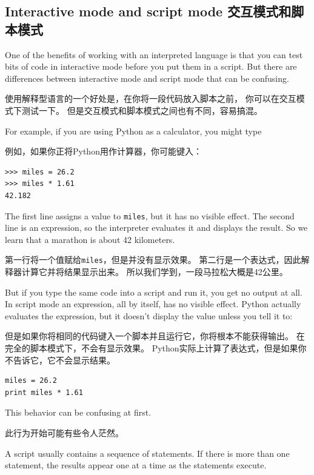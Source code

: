 \documentclass[10pt]{book}
\begin{document}
\begin{CJK}{UTF8}{gbsn}
\section{Interactive mode and script mode 交互模式和脚本模式}

One of the benefits of working with an interpreted language is that
you can test bits of code in interactive mode before you put them
in a script.  But there are differences between interactive mode
and script mode that can be confusing.

使用解释型语言的一个好处是，在你将一段代码放入脚本之前，
你可以在交互模式下测试一下。
但是交互模式和脚本模式之间也有不同，容易搞混。

For example, if you are using Python as a calculator, you might type

例如，如果你正将Python用作计算器，你可能键入：

\begin{verbatim}
>>> miles = 26.2
>>> miles * 1.61
42.182
\end{verbatim}

The first line assigns a value to {\tt miles}, but it has no visible
effect.  The second line is an expression, so the interpreter
evaluates it and displays the result.  So we learn that a marathon is
about 42 kilometers.

第一行将一个值赋给{\tt miles}，但是并没有显示效果。
第二行是一个表达式，因此解释器计算它并将结果显示出来。
所以我们学到，一段马拉松大概是42公里。

But if you type the same code into a script and run it, you get no
output at all.  In script mode an expression, all by itself, has no
visible effect.  Python actually evaluates the expression, but it doesn't
display the value unless you tell it to:

但是如果你将相同的代码键入一个脚本并且运行它，你将根本不能获得输出。
在完全的脚本模式下，不会有显示效果。
Python实际上计算了表达式，但是如果你不告诉它，它不会显示结果。

\begin{verbatim}
miles = 26.2
print miles * 1.61
\end{verbatim}

This behavior can be confusing at first.

此行为开始可能有些令人茫然。

A script usually contains a sequence of statements.  If there
is more than one statement, the results appear one at a time
as the statements execute.


\end{CJK}
\end{document}
